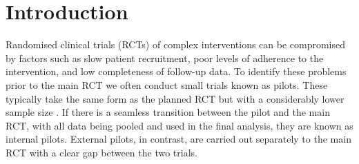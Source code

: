 \documentclass[AMA,STIX1COL]{WileyNJD-v2}
\begin{document}
\maketitle

\section{Introduction}\label{sec:introduction}


Randomised clinical trials (RCTs) of complex interventions can be compromised by factors such as slow patient recruitment, poor levels of adherence to the intervention, and low completeness of follow-up data. To identify these problems prior to the main RCT we often conduct small trials \cite{Craig2008} known as pilots. These typically take the same form as the planned RCT but with a considerably lower sample size \cite{Eldridge2016}. If there is a seamless transition between the pilot and the main RCT, with all data being pooled and used in the final analysis, they are known as internal pilots. External pilots, in contrast, are carried out separately to the main RCT with a clear gap between the two trials.




\end{document}
